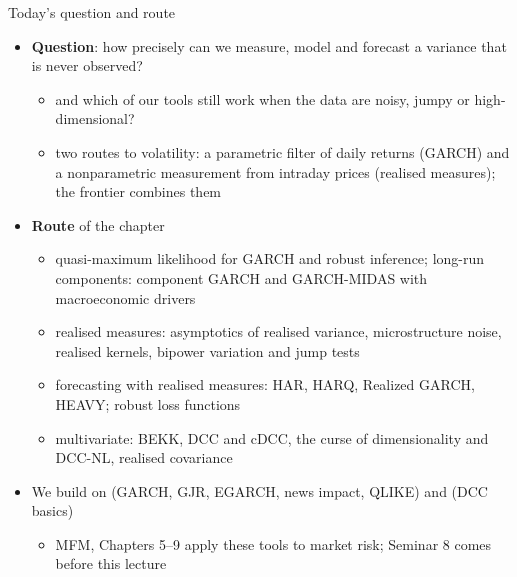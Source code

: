 \begin{frame}{Today's question and route}
\itemsize{\small}
\begin{itemize}
    \item \textbf{Question}: how precisely can we measure, model and forecast a variance that is never observed?
    \begin{itemize}
        \item and which of our tools still work when the data are noisy, jumpy or high-dimensional?
        \item two routes to volatility: a parametric filter of daily returns (GARCH) and a nonparametric measurement from intraday prices (realised measures); the frontier combines them
    \end{itemize}
    \item \textbf{Route} of the chapter
    \begin{itemize}
        \item quasi-maximum likelihood for GARCH and robust inference; long-run components: component GARCH and GARCH-MIDAS with macroeconomic drivers
        \item realised measures: asymptotics of realised variance, microstructure noise, realised kernels, bipower variation and jump tests
        \item forecasting with realised measures: HAR, HARQ, Realized GARCH, HEAVY; robust loss functions
        \item multivariate: BEKK, DCC and cDCC, the curse of dimensionality and DCC-NL, realised covariance
    \end{itemize}
    \item We build on  (GARCH, GJR, EGARCH, news impact, QLIKE) and  (DCC basics)
    \begin{itemize}
        \item MFM, Chapters 5--9 apply these tools to market risk; Seminar 8 comes before this lecture
    \end{itemize}
\end{itemize}
\end{frame}

